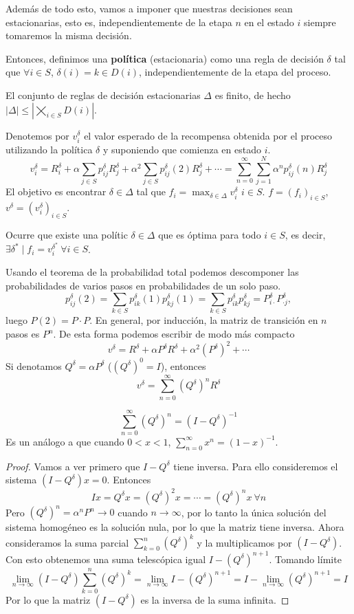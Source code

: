 \documentclass[MIOP.tex]{subfiles}
\begin{document}
Además de todo esto, vamos a imponer que nuestras decisiones sean estacionarias, esto es, independientemente de la etapa $n$ en el estado $i$ siempre tomaremos la misma decisión. 

Entonces, definimos una \textbf{política} (estacionaria) como una regla de decisión $\delta$ tal que $\forall i\in S$, $\delta(i)=k\in D(i)$, independientemente de la etapa del proceso.

El conjunto de reglas de decisión estacionarias $\Delta$ es finito, de hecho $|\Delta|\leq |\bigtimes_{i\in S} D(i)|$.  

Denotemos por $v^\delta_i$ el valor esperado de la recompensa obtenida por el proceso utilizando la política $\delta$ y suponiendo que comienza en estado $i$. 
$$v^\delta_i=R^\delta_i+\alpha\sum_{j\in S} p_{ij}^\delta R_j^\delta +\alpha^2\sum_{j\in S}p_{ij}^\delta(2)R_j^\delta+\cdots=\sum_{n=0}^\infty\sum_{j=1}^N\alpha^n p_{ij}^\delta(n) R_j^\delta$$
El objetivo es encontrar $\delta\in\Delta$ tal que $f_i=\max_{\delta\in\Delta}v_i^\delta$ $i\in S$. $f=(f_i)_{i\in S}$, $v^\delta=(v_i^\delta)_{i\in S}$.


\begin{observacion}
Ocurre que existe una polític $\delta\in\Delta$ que es óptima para todo $i\in S$, es decir, $\exists \delta^*\mid f_i=v_i^{\delta^*}\ \forall i\in S$.
\end{observacion}
\begin{observacion}
Usando el teorema de la probabilidad total podemos descomponer las probabilidades de varios pasos en probabilidades de un solo paso.
$$p_{ij}^\delta(2)=\sum_{k\in S}p_{ik}^\delta(1)p_{kj}^\delta(1)=\sum_{k\in S}p_{ik}^\delta p_{kj}^\delta=P^\delta_{i\cdot}P^\delta_{\cdot j},$$
luego $P(2)=P\cdot P$. En general, por inducción, la matriz de transición en $n$ pasos es $P^n$. De esta forma podemos escribir de modo más compacto
$$v^\delta=R^\delta+ \alpha P^\delta R^\delta +\alpha^2 (P^\delta)^2+\cdots$$
Si denotamos $Q^\delta=\alpha P^\delta$ ($(Q^\delta)^0=I$), entonces
$$v^\delta=\sum_{n=0}^\infty (Q^\delta)^n R^\delta$$
\end{observacion}

\begin{lemma}
$$\sum_{n=0}^\infty (Q^\delta)^n=(I-Q^\delta)^{-1}$$
Es un análogo a que cuando $0<x<1$, $\sum_{n=0}^\infty x^n=(1-x)^{-1}$. 
\end{lemma}
\begin{proof}
Vamos a ver primero que $I-Q^\delta$ tiene inversa. Para ello consideremos el sistema $(I-Q^\delta)x=0$. Entonces
$$Ix=Q^\delta x=(Q^\delta)^2x=\cdots=(Q^\delta)^nx\ \forall n$$
Pero $(Q^\delta)^n=\alpha^n P^n\to 0$ cuando $n\to\infty$, por lo tanto la única solución del sistema homogéneo es la solución nula, por lo que la matriz tiene inversa. Ahora consideramos la suma parcial $\sum_{k=0}^n (Q^\delta)^k$ y la multiplicamos por $(I-Q^\delta)$. Con esto obtenemos una suma telescópica igual $I-(Q^\delta)^{n+1}$. Tomando límite
$$\lim_{n\to\infty}(I-Q^\delta)\sum_{k=0}^n (Q^\delta)^k=\lim_{n\to\infty}I-(Q^\delta)^{n+1}=I-\lim_{n\to\infty}(Q^\delta)^{n+1}=I$$
Por lo que la matriz $(I-Q^\delta)$ es la inversa de la suma infinita.
\end{proof}
\end{document}
